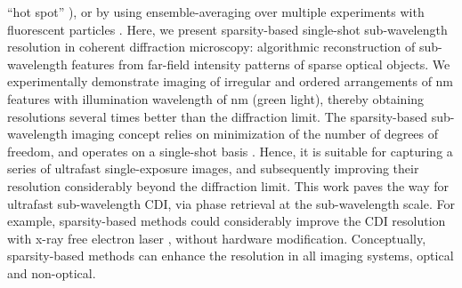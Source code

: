 ``hot spot''
),
or by using ensemble-averaging over multiple experiments with
fluorescent particles
.  Here, we present
sparsity-based single-shot sub-wavelength resolution in coherent
diffraction microscopy: algorithmic reconstruction of sub-wavelength
features from far-field intensity patterns of sparse optical
objects. We experimentally demonstrate imaging of irregular and
ordered arrangements of \unit[100]{nm} features with illumination wavelength of
\unit[532]{nm} (green light), thereby obtaining resolutions several times
better than the diffraction limit. The sparsity-based sub-wavelength
imaging concept relies on minimization of the number of degrees of
freedom, and operates on a single-shot basis
.
Hence, it is suitable for capturing a series of ultrafast
single-exposure images, and subsequently improving their resolution
considerably beyond the diffraction limit. This work paves the way for
ultrafast sub-wavelength CDI, via phase retrieval at the
sub-wavelength scale. For example, sparsity-based methods could
considerably improve the CDI resolution with x-ray free electron laser
, without hardware
modification. Conceptually, sparsity-based methods can enhance the
resolution in all imaging systems, optical and non-optical.

